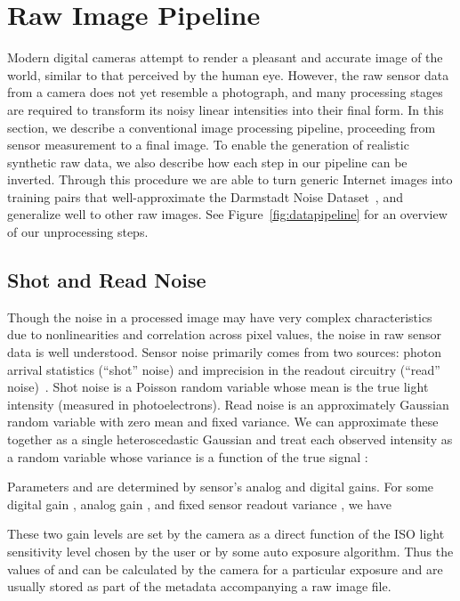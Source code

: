 \documentclass[10pt,twocolumn,letterpaper]{article}
\begin{document}
\section{Raw Image Pipeline}
\label{sec:image_formation_pipeline}

Modern digital cameras attempt to render a pleasant and accurate image of the world, similar to that perceived by the human eye. However, the raw sensor data from a camera does not yet resemble a photograph, and many processing stages are required to transform its noisy linear intensities into their final form. In this section, we describe a conventional image processing pipeline, proceeding from sensor measurement to a final image. To enable the generation of realistic synthetic raw data, we also describe how each step in our pipeline can be inverted. Through this procedure we are able to turn generic Internet images into training pairs that well-approximate the Darmstadt Noise Dataset~\cite{plotz2017cvpr}, and generalize well to other raw images.
See Figure~\ref{fig:datapipeline} for an overview of our unprocessing steps.

\subsection{Shot and Read Noise}
\label{sec:noise}

Though the noise in a processed image may have very complex characteristics due to nonlinearities and correlation across pixel values, the noise in raw sensor data is well understood.
Sensor noise primarily comes from two sources: photon arrival statistics (``shot'' noise) and imprecision in the readout circuitry (``read'' noise)~\cite{Hasinoff2014}. Shot noise is a Poisson random variable whose mean is the true light intensity (measured in photoelectrons). Read noise is an approximately Gaussian random variable with zero mean and fixed variance. We can approximate these together as a single heteroscedastic Gaussian and treat each observed intensity  as a random variable whose variance is a function of the true signal :

Parameters  and  are determined by sensor's analog and digital gains. For some digital gain , analog gain , and fixed sensor readout variance , we have

These two gain levels are set by the camera as a direct function of the ISO light sensitivity level chosen by the user or by some auto exposure algorithm. Thus the values of  and  can be calculated by the camera for a particular exposure and are usually stored as part of the metadata accompanying a raw image file.
\end{document}
